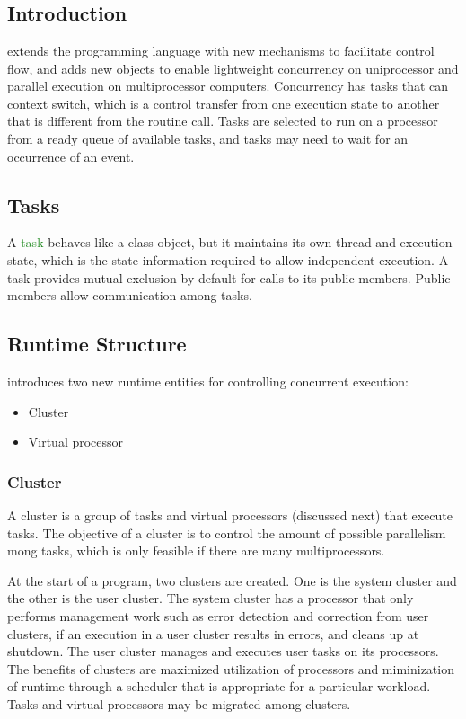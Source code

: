 \chapter{\uCPP} \label{uCPP}

\section{Introduction}
\uCPPS \cite{reference10} extends the \CCS programming language with new
mechanisms to
facilitate control flow, and adds new objects to enable lightweight concurrency
on uniprocessor and parallel execution on multiprocessor computers. Concurrency has tasks
that can context switch, which is a control transfer from one execution state to
another that is different from the routine call. Tasks are selected to run on a
processor from a ready queue of available tasks, and tasks may need to wait for an occurrence of an event.

\section{Tasks}
A \textcolor{ForestGreen}{task} behaves like a class object, but it maintains its own
thread and execution state, which is the state information required to allow
independent execution. A task provides mutual exclusion by default for calls to its
public members. Public members allow communication among tasks.

\section{\uCPPS Runtime Structure}
\uCPPS introduces two new runtime entities for controlling concurrent execution:
\begin{itemize}
    \item Cluster
    \item Virtual processor
\end{itemize}

\subsection{Cluster}
A cluster is a group of tasks and virtual processors (discussed next) that
execute tasks. The objective of a cluster is to control the amount of possible
parallelism mong tasks, which is only feasible if there are many
multiprocessors.

At the start of a \uCPPS program, two clusters are created. One is the system
cluster and the other is the user cluster. The system cluster has a
processor that only performs management work such as error detection and
correction from user clusters, if an execution in a user cluster results in errors,
and cleans up at shutdown. The user cluster manages and
executes user tasks on its processors. The benefits of clusters
are maximized utilization of processors and miminization of runtime through a scheduler that is appropriate for a particular workload. Tasks and virtual
processors may be migrated among clusters.

